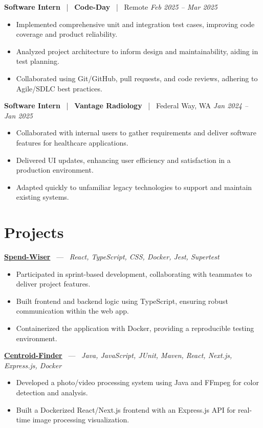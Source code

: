 \documentclass[10pt, letterpaper]{article}
\newcommand{\jobhead}[4]{%
  \vspace{5pt}%
  {\bfseries\color{dark}#1}%
  ~{\color{light}|}~%
  {\bfseries\color{navy}#2}%
  ~{\color{light}|}~%
  {\color{light}#3}%
  \hfill{\color{light}\small\textit{#4}}\\[-2pt]%
}
\newcommand{\projhead}[3]{%
  \vspace{5pt}%
  {\bfseries\color{dark}\href{#2}{#1}}%
  ~{\color{light}---}~%
  {\color{light}\small\textit{#3}}\\[-2pt]%
}
\begin{document}
\jobhead{Software Intern}{Code-Day}{Remote}{Feb 2025 – Mar 2025}
\begin{itemize}
  \item Implemented comprehensive unit and integration test cases, improving code coverage and product reliability.
  \item Analyzed project architecture to inform design and maintainability, aiding in test planning.
  \item Collaborated using Git/GitHub, pull requests, and code reviews, adhering to Agile/SDLC best practices.
\end{itemize}

\jobhead{Software Intern}{Vantage Radiology}{Federal Way, WA}{Jan 2024 – Jan 2025}
\begin{itemize}
  \item Collaborated with internal users to gather requirements and deliver software features for healthcare applications.
  \item Delivered UI updates, enhancing user efficiency and satisfaction in a production environment.
  \item Adapted quickly to unfamiliar legacy technologies to support and maintain existing systems.
\end{itemize}

\section{Projects}

\projhead{Spend-Wiser}{https://github.com/JesseChum/w26-sdev372-spendwiser-finance-tracker}{React, TypeScript, CSS, Docker, Jest, Supertest}
\begin{itemize}
  \item Participated in sprint-based development, collaborating with teammates to deliver project features.
  \item Built frontend and backend logic using TypeScript, ensuring robust communication within the web app.
  \item Containerized the application with Docker, providing a reproducible testing environment.
\end{itemize}

\projhead{Centroid-Finder}{https://github.com/xavierb117/centroid-finder}{Java, JavaScript, JUnit, Maven, React, Next.js, Express.js, Docker}
\begin{itemize}
  \item Developed a photo/video processing system using Java and FFmpeg for color detection and analysis.
  \item Built a Dockerized React/Next.js frontend with an Express.js API for real-time image processing visualization.
\end{itemize}
\end{document}
